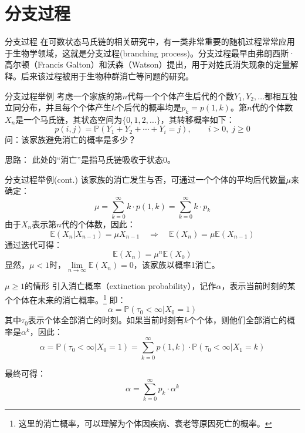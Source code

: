 \documentclass[t]{beamer}
\renewcommand{\Pr}{\mathbb{P}}
\newcommand{\E}{\mathbb{E}}
\begin{document}
\section{分支过程}

\begin{frame}{分支过程}
    在可数状态马氏链的相关研究中，有一类非常重要的随机过程常常应用于生物学领域，这就是分支过程(branching process)。分支过程最早由弗朗西斯·高尔顿（Francis  Galton）和沃森（Watson）提出，用于对姓氏消失现象的定量解释。后来该过程被用于生物种群消亡等问题的研究。
\end{frame}


\begin{frame}{分支过程举例}
    考虑一个家族的第$n$代每一个个体产生后代的个数$Y_1,Y_2,\ldots$都相互独立同分布，并且每个个体产生$k$个后代的概率均是$p_k=p(1,k)$。第$n$代的个体数$X_n$是一个马氏链，其状态空间为$\{0,1,2,\ldots\}$，其转移概率如下：
    \[p(i,j)=\Pr(Y_1+Y_2+\cdots+Y_i=j),\qquad i>0,\; j\ge 0 \]
    问：该家族避免消亡的概率是多少？

    \begin{block}{思路：}
        此处的“消亡”是指马氏链吸收于状态0。
    \end{block}
\end{frame}




\begin{frame}{分支过程举例(cont.)}
    该家族的消亡发生与否，可通过一个个体的平均后代数量$\mu$来确定：
    \[\mu=\sum_{k=0}^{\infty}k\cdot p(1,k)=\sum_{k=0}^{\infty}k\cdot p_k \]
    由于$X_n$表示第$n$代的个体数，因此：
    \[\E(X_n|X_{n-1})=\mu X_{n-1} \quad \Rightarrow\quad \E(X_n)=\mu\E(X_{n-1}) \]
    通过迭代可得：\[\E(X_n)=\mu^{n}\E(X_0) \]
    显然，{$\mu<1$时，$\lim\limits_{n\to\infty}\E(X_n)=0$，该家族以概率1消亡。}
\end{frame}


\begin{frame}{$\mu\ge1$的情形}
    引入消亡概率（extinction probability），记作$\alpha$，表示当前时刻的某个个体在未来的消亡概率。\footnote{这里的消亡概率，可以理解为个体因疾病、衰老等原因死亡的概率。}
    即：$$\alpha=\Pr(\tau_0<\infty|X_0=1)$$
    其中$\tau_0$表示个体全部消亡的时刻。如果当前时刻有$k$个个体，则他们全部消亡的概率是$\alpha^k$，因此：
    \[\alpha=\Pr(\tau_0<\infty|X_0=1)=\sum^{\infty}_{k=0}p(1,k)\cdot {\Pr(\tau_0<\infty|X_1=k)}
    \]

    最终可得：
\begin{equation*}
\alpha=\sum^{\infty}_{k=0}p_k\cdot {\alpha^k} 
\end{equation*}
\end{frame}
\end{document}
